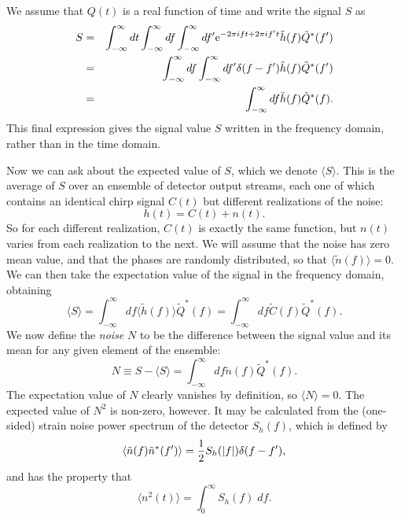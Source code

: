 We assume that $Q(t)$ is a real function of time and write the 
signal $S$ as
\begin{eqnarray}
\nonumber
S &=& \int_{-\infty}^\infty dt  \int_{-\infty}^\infty df  \int_{-\infty}^\infty df'
{\rm e}^{-2 \pi i f t+2 \pi i f' t} \tilde h(f) \tilde Q^* (f')\\
\nonumber
&=& 
\int_{-\infty}^\infty df  \int_{-\infty}^\infty df'
\delta(f-f') \tilde h(f) \tilde Q^* (f')\\
&=& 
\int_{-\infty}^\infty df \tilde h(f) \tilde Q^* (f).
\end{eqnarray}
This final expression gives the signal value $S$ written in the
frequency domain, rather than in the time domain.

Now we can ask about the expected value of $S$, which we denote 
$\langle S \rangle$. This is the average of $S$ over an ensemble of 
detector output streams, each one of which contains an identical 
chirp signal $C(t)$ but different realizations of the noise:
\begin{equation}
h(t) = C(t) + n(t).
\end{equation}
So for each different realization, $C(t)$ is exactly the same function,
but $n(t)$ varies from each realization to the next.  We will assume
that the noise has zero mean value, and that the phases are randomly
distributed, so that $\langle \tilde n(f) \rangle=0$.  We can then take
the expectation value of the signal in the frequency domain, obtaining
\begin{equation}
\langle S \rangle = \int_{-\infty}^\infty df \langle \tilde h(f)
\rangle \tilde Q^*(f) = \int_{-\infty}^\infty df \tilde C(f) \tilde
Q^*(f).
\end{equation}
We now define the {\it noise} $N$ to be the difference between the
signal value and its mean for any given element of the ensemble:
\begin{equation}
\label{e:noise}
N \equiv S-\langle S \rangle = \int_{-\infty}^\infty df \tilde n(f) \tilde Q^* (f).
\end{equation}
The expectation value of $N$ clearly vanishes by definition, so
$\langle N \rangle=0$.  The expected value of $N^2$ is non-zero,
however.   It may be calculated from the (one-sided) strain noise power
spectrum of the detector $S_h(f)$, which is defined by
\begin{equation}
\label{e:nspec}
\langle \tilde n(f) \tilde n^*(f') \rangle = {1 \over 2} S_h(|f|) \delta(f-f'),
\end{equation}
and has the property that 
\begin{equation}
\langle n^2(t) \rangle = \int_0^\infty S_h(f) \; df.
\end{equation}
